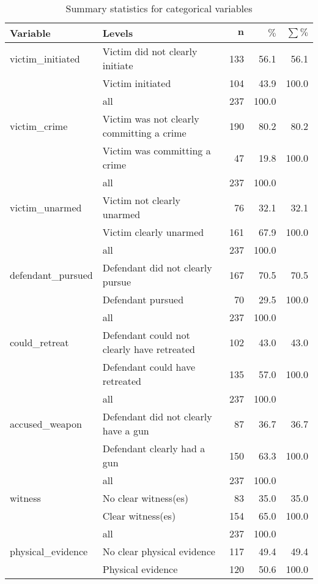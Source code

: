 \documentclass[11pt, oneside]{article}   	%
\begin{document}
{\footnotesize
\begin{longtable}{ll|rrr}
\caption{Summary statistics for categorical variables} \\ 
 \textbf{Variable} & \textbf{Levels} & $\mathbf{n}$ & $\mathbf{\%}$ & $\mathbf{\sum \%}$ \\ 
  \hline
victim\_initiated & Victim did not clearly initiate & 133 & 56.1 & 56.1 \\ 
   & Victim initiated & 104 & 43.9 & 100.0 \\ 
   \hline
 & all & 237 & 100.0 &  \\ 
   \hline
\hline
victim\_crime & Victim was not clearly committing a crime & 190 & 80.2 & 80.2 \\ 
   & Victim was committing a crime & 47 & 19.8 & 100.0 \\ 
   \hline
 & all & 237 & 100.0 &  \\ 
   \hline
\hline
victim\_unarmed & Victim not clearly unarmed & 76 & 32.1 & 32.1 \\ 
   & Victim clearly unarmed & 161 & 67.9 & 100.0 \\ 
   \hline
 & all & 237 & 100.0 &  \\ 
   \hline
\hline
defendant\_pursued & Defendant did not clearly pursue & 167 & 70.5 & 70.5 \\ 
   & Defendant pursued & 70 & 29.5 & 100.0 \\ 
   \hline
 & all & 237 & 100.0 &  \\ 
   \hline
\hline
could\_retreat & Defendant could not clearly have retreated & 102 & 43.0 & 43.0 \\ 
   & Defendant could have retreated & 135 & 57.0 & 100.0 \\ 
   \hline
 & all & 237 & 100.0 &  \\ 
   \hline
\hline
accused\_weapon & Defendant did not clearly have a gun & 87 & 36.7 & 36.7 \\ 
   & Defendant clearly had a gun & 150 & 63.3 & 100.0 \\ 
   \hline
 & all & 237 & 100.0 &  \\ 
   \hline
\hline
witness & No clear witness(es) & 83 & 35.0 & 35.0 \\ 
   & Clear witness(es) & 154 & 65.0 & 100.0 \\ 
   \hline
 & all & 237 & 100.0 &  \\ 
   \hline
\hline
physical\_evidence & No clear physical evidence & 117 & 49.4 & 49.4 \\ 
   & Physical evidence & 120 & 50.6 & 100.0 \\ 

\end{longtable}}
\end{document}
